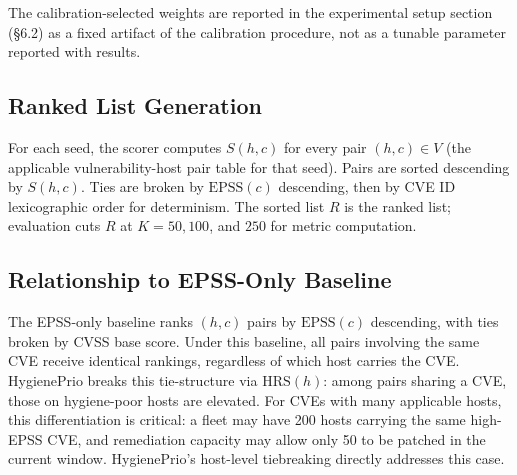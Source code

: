 The calibration-selected weights are reported in the experimental setup section (\S6.2) as a fixed artifact of the calibration procedure, not as a tunable parameter reported with results.

\subsection{Ranked List Generation}

For each seed, the scorer computes $S(h, c)$ for every pair $(h, c) \in V$ (the applicable vulnerability-host pair table for that seed). Pairs are sorted descending by $S(h, c)$. Ties are broken by $\mathrm{EPSS}(c)$ descending, then by CVE ID lexicographic order for determinism. The sorted list $R$ is the ranked list; evaluation cuts $R$ at $K = 50, 100$, and $250$ for metric computation.

\subsection{Relationship to EPSS-Only Baseline}

The EPSS-only baseline ranks $(h, c)$ pairs by $\mathrm{EPSS}(c)$ descending, with ties broken by CVSS base score. Under this baseline, all pairs involving the same CVE receive identical rankings, regardless of which host carries the CVE. HygienePrio breaks this tie-structure via $\mathrm{HRS}(h)$: among pairs sharing a CVE, those on hygiene-poor hosts are elevated. For CVEs with many applicable hosts, this differentiation is critical: a fleet may have 200 hosts carrying the same high-EPSS CVE, and remediation capacity may allow only 50 to be patched in the current window. HygienePrio's host-level tiebreaking directly addresses this case.

